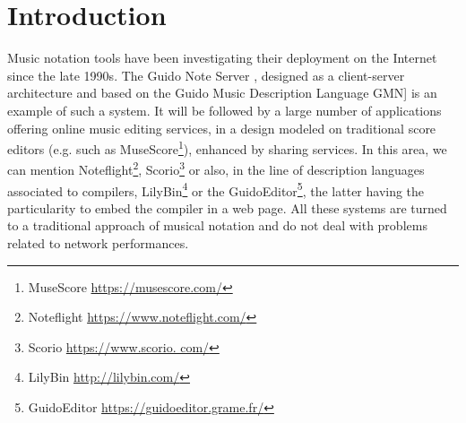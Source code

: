 \documentclass{article}
\title{\papertitle}
\begin{document}
%
\capstartfalse
\maketitle
\capstarttrue
%
\begin{abstract}
We present an online environment for the design of musical scores, which also allows the embedding of signal processors and thus the publication of electronic works. This environment is part of the INScore project, which latest version has been transcribed into WebAssembly/Javascript, to provide in a web browser both the diversity of music representations supported by INScore, the interaction capabilities and all the dynamic aspects of the score as offered by the native version.

After some historical elements about distributed music scores, we will make some reminders about the INScore project and its associated description language. We will then describe the architecture of the system and the choices made for its portability to the Web. Then we will present the extensions specific to the Javascript version and in particular the support of signal processing objects. 
Finally, we will show how INScore's communication system has been extended to allow online music score control from a native version of INScore, paving the way for real-time performance on the web.

\end{abstract}


\section{Introduction}\label{sec:introduction}

Music notation tools have been investigating their deployment on the Internet since the late 1990s. The Guido Note Server \cite{renz98}, designed as a client-server architecture and based on the Guido Music Description Language \cite{hoos98} GMN] is an example of such a system. It will be followed by a large number of applications offering online music editing services, in a design modeled on traditional score editors (e.g. such as MuseScore\footnote{MuseScore \url{https://musescore.com/}}), enhanced by sharing services. 
In this area, we can mention Noteflight\footnote{Noteflight \url{https://www.noteflight.com/}}, Scorio\footnote{Scorio \url{https://www.scorio. com/}} or also, in the line of description languages associated to compilers, LilyBin\footnote{LilyBin \url{http://lilybin.com/}} or the GuidoEditor\footnote{GuidoEditor \url{https://guidoeditor.grame.fr/}}, the latter having the particularity to embed the compiler in a web page.
All these systems are turned to a traditional approach of musical notation and do not deal with problems related to network performances.
\end{document}
